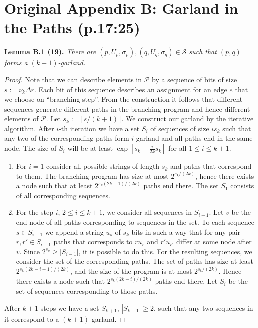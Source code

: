 \documentclass[10pt,a4paper]{article}
\newenvironment{result}[1]{\par\medskip\noindent\textbf{#1.}\itshape}{\par\medskip}
\begin{document}
\section*{Original Appendix B: Garland in the Paths (p.17:25)}
\begin{result}{Lemma B.1 (19)}
There are $(p,U_p,\sigma_p),(q,U_q,\sigma_q)\in\mathcal S$ such that $(p,q)$ forms a $(k+1)$-garland.
\end{result}
\begin{proof}
Note that we can describe elements in $\mathcal P$ by a sequence of bits of size $s:=\nu_k\Delta r$. Each bit of this sequence describes an assignment for an edge $e$ that we choose on ``branching step''. From the construction it follows that different sequences generate different paths in the branching program and hence different elements of $\mathcal P$.
Let $s_k:=\lfloor s/(k+1)\rfloor$. We construct our garland by the iterative algorithm. After $i$-th iteration we have a set $S_i$ of sequences of size $is_k$ such that any two of the corresponding paths form $i$-garland and all paths end in the same node. The size of $S_i$ will be at least $\exp[s_k-\frac{i}{2k}s_k]$ for all $1\le i\le k+1$.
\begin{enumerate}
\item For $i=1$ consider all possible strings of length $s_k$ and paths that correspond to them. The branching program has size at most $2^{s_k/(2k)}$, hence there exists a node such that at least $2^{s_k(2k-1)/(2k)}$ paths end there. The set $S_1$ consists of all corresponding sequences.
\item For the step $i$, $2\le i\le k+1$, we consider all sequences in $S_{i-1}$. Let $v$ be the end node of all paths corresponding to sequences in the set. To each sequence $s\in S_{i-1}$ we append a string $u_s$ of $s_k$ bits in such a way that for any pair $r,r'\in S_{i-1}$ paths that corresponds to $ru_r$ and $r'u_{r'}$ differ at some node after $v$. Since $2^{s_k}\ge|S_{i-1}|$, it is possible to do this.
For the resulting sequences, we consider the set of the corresponding paths. The set of paths has size at least $2^{s_k(2k-i+1)/(2k)}$, and the size of the program is at most $2^{s_k/(2k)}$. Hence there exists a node such that $2^{s_k(2k-i)/(2k)}$ paths end there. Let $S_i$ be the set of sequences corresponding to those paths.
\end{enumerate}
After $k+1$ steps we have a set $S_{k+1}$, $|S_{k+1}|\ge2$, such that any two sequences in it correspond to a $(k+1)$-garland.
\end{proof}
\end{document}
